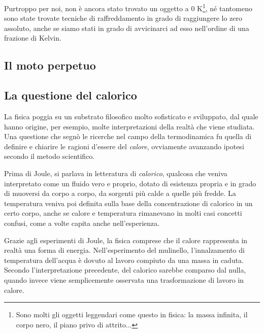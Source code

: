 Purtroppo per noi, non è ancora stato trovato un oggetto a 0 K\footnote{Sono
molti gli oggetti leggendari come questo in fisica: la massa infinita, il
corpo nero, il piano privo di attrito...}, né tantomeno sono state
trovate tecniche di raffreddamento in grado di raggiungere lo zero
assoluto, anche se siamo stati in grado di avvicinarci ad esso
nell'ordine di una frazione di Kelvin.

\subsection{Il moto perpetuo}


\subsection{La questione del calorico}
La fisica poggia su un substrato filosofico molto sofisticato e
sviluppato, dal quale hanno origine, per esempio, molte interpretazioni
della realtà che viene studiata. Una questione che segnò le ricerche
nel campo della termodinamica fu quella di definire e chiarire le
ragioni d'essere del \textit{calore}, ovviamente avanzando ipotesi
secondo il metodo scientifico.

Prima di Joule, si parlava in letteratura di \textit{calorico},
qualcosa che veniva interpretato come un fluido vero e proprio,
dotato di esistenza propria e in grado di muoversi da corpo a
corpo, da sorgenti più calde a quelle più fredde. La temperatura
veniva poi definita sulla base della concentrazione di calorico
in un certo corpo, anche se calore e temperatura rimanevano in
molti casi concetti confusi, come a volte capita anche nell'esperienza.

Grazie agli esperimenti di Joule, la fisica comprese che il calore
rappresenta in realtà una forma di energia. Nell'esperimento del
mulinello, l'innalzamento di temperatura dell'acqua è dovuto al
lavoro compiuto da una massa in caduta. Secondo l'interpretazione
precedente, del calorico sarebbe comparso dal nulla, quando invece
viene semplicemente osservata una trasformazione di lavoro in calore.































